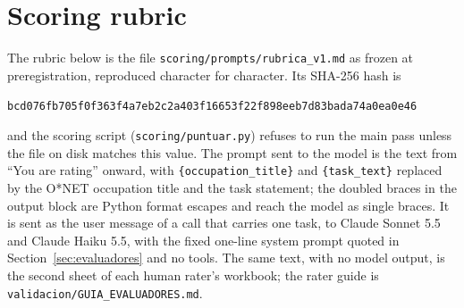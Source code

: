 \section{Scoring rubric}
\label{app:rubrica}

The rubric below is the file \texttt{scoring/prompts/rubrica\_v1.md} as frozen at preregistration, reproduced character for character.
Its SHA-256 hash is
\begin{center}\small\texttt{bcd076fb705f0f363f4a7eb2c2a403f16653f22f898eeb7d83bada74a0ea0e46}\end{center}
and the scoring script (\texttt{scoring/puntuar.py}) refuses to run the main pass unless the file on disk matches this value.
The prompt sent to the model is the text from ``You are rating'' onward, with \texttt{\{occupation\_title\}} and \texttt{\{task\_text\}} replaced by the O*NET occupation title and the task statement; the doubled braces in the output block are Python format escapes and reach the model as single braces.
It is sent as the user message of a call that carries one task, to Claude Sonnet 5.5 and Claude Haiku 5.5, with the fixed one-line system prompt quoted in Section~\ref{sec:evaluadores} and no tools.
The same text, with no model output, is the second sheet of each human rater's workbook; the rater guide is \texttt{validacion/GUIA\_EVALUADORES.md}.


